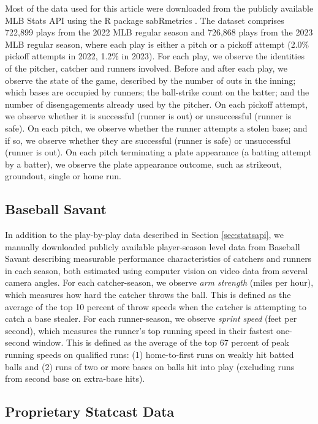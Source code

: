 \documentclass{article}
\begin{document}
      Most of the data used for this article were downloaded from the publicly available MLB Stats API using the R package sabRmetrics \citep{powers_sabrmetrics_2024}. The dataset comprises 722,899 plays from the 2022 MLB regular season and 726,868 plays from the 2023 MLB regular season, where each play is either a pitch or a pickoff attempt (2.0\% pickoff attempts in 2022, 1.2\% in 2023). For each play, we observe the identities of the pitcher, catcher and runners involved. Before and after each play, we observe the state of the game, described by the number of outs in the inning; which bases are occupied by runners; the ball-strike count on the batter; and the number of disengagements already used by the pitcher. On each pickoff attempt, we observe whether it is successful (runner is out) or unsuccessful (runner is safe). On each pitch, we observe whether the runner attempts a stolen base; and if so, we observe whether they are successful (runner is safe) or unsuccessful (runner is out). On each pitch terminating a plate appearance (a batting attempt by a batter), we observe the plate appearance outcome, such as strikeout, groundout, single or home run.

    \subsection{Baseball Savant}
    \label{sec:baseballsavant}

      In addition to the play-by-play data described in Section \ref{sec:statsapi}, we manually downloaded publicly available player-season level data from Baseball Savant \citep{mlb_advanced_media_notitle_2024} describing measurable performance characteristics of catchers and runners in each season, both estimated using computer vision on video data from several camera angles. For each catcher-season, we observe {\it arm strength} (miles per hour), which measures how hard the catcher throws the ball. This is defined as the average of the top 10 percent of throw speeds when the catcher is attempting to catch a base stealer. For each runner-season, we observe {\it sprint speed} (feet per second), which measures the runner's top running speed in their fastest one-second window. This is defined as the average of the top 67 percent of peak running speeds on qualified runs: (1) home-to-first runs on weakly hit batted balls and (2) runs of two or more bases on balls hit into play (excluding runs from second base on extra-base hits).

    \subsection{Proprietary Statcast Data}
\end{document}
